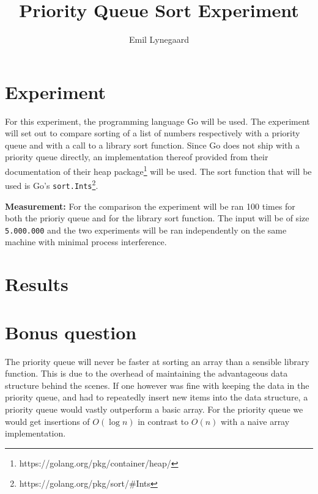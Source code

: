 \documentclass[a5paper]{article}
\title{Priority Queue Sort Experiment}
\author{Emil Lynegaard}
\begin{document}
  \maketitle
  \section{Experiment}
  For this experiment, the programming language Go will be used. The experiment will set out to compare sorting of a list of numbers respectively with a priority queue and with a call to a library sort function. Since Go does not ship with a priority queue directly, an implementation thereof provided from their documentation of their heap package\footnote{https://golang.org/pkg/container/heap/} will be used. The sort function that will be used is Go's \texttt{sort.Ints}\footnote{https://golang.org/pkg/sort/\#Ints}.

\textbf{Measurement:} For the comparison the experiment will be ran 100 times for both the prioriy queue and for the library sort function. The input will be of size \texttt{5.000.000} and the two experiments will be ran independently on the same machine with minimal process interference.

\section{Results}
\section{Bonus question}
The priority queue will never be faster at sorting an array than a sensible library function. This is due to the overhead of maintaining the advantageous data structure behind the scenes. If one however was fine with keeping the data in the priority queue, and had to repeatedly insert new items into the data structure, a priority queue would vastly outperform a basic array. For the priority queue we would get insertions of $O(\log n)$ in contrast to $O(n)$ with a naive array implementation.
\end{document}
